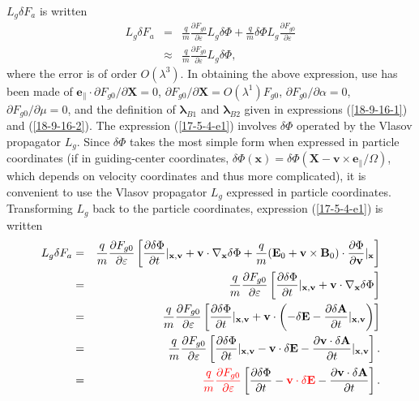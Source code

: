 \documentclass{article}
\newcommand{\nobracket}{}
\newcommand{\tmcolor}[2]{{\color{#1}{#2}}}
\newcommand{\tmmathbf}[1]{\ensuremath{\boldsymbol{#1}}}
\begin{document}
$L_g \delta F_a$ is written
\begin{eqnarray}
  L_g \delta F_a & = & \frac{q}{m}  \frac{\partial F_{g 0}}{\partial
  \varepsilon} L_g \delta \Phi + \frac{q}{m} \delta \Phi L_g \frac{\partial
  F_{g 0}}{\partial \varepsilon} \nonumber\\
  & \approx & \frac{q}{m}  \frac{\partial F_{g 0}}{\partial \varepsilon} L_g
  \delta \Phi,  \label{17-5-4-e1}
\end{eqnarray}
where the error is of order $O (\lambda^3)$. In obtaining the above
expression, use has been made of $\mathbf{e}_{\parallel} \cdot \partial F_{g
0} / \partial \mathbf{X}= 0$, $\partial F_{g 0} / \partial \mathbf{X}= O
(\lambda^1) F_{g 0}$, $\partial F_{g 0} / \partial \alpha = 0$, $\partial F_{g
0} / \partial \mu = 0$, and the definition of $\tmmathbf{\lambda}_{B 1}$ and
$\tmmathbf{\lambda}_{B 2}$ given in expressions (\ref{18-9-16-1}) and
(\ref{18-9-16-2}). The expression (\ref{17-5-4-e1}) involves $\delta \Phi$
operated by the Vlasov propagator $L_g$. Since $\delta \Phi$ takes the most
simple form when expressed in particle coordinates (if in guiding-center
coordinates, $\delta \Phi (\mathbf{x}) = \delta \Phi (\mathbf{X}-\mathbf{v}
\times \mathbf{e}_{\parallel} / \Omega)$, which depends on velocity
coordinates and thus more complicated), it is convenient to use the Vlasov
propagator $L_g$ expressed in particle coordinates. Transforming $L_g$ back to
the particle coordinates, expression (\ref{17-5-4-e1}) is written
\begin{eqnarray}
  L_g \delta F_a & = & \frac{q}{m}  \frac{\partial F_{g 0}}{\partial
  \varepsilon} \left[ \frac{\partial \delta \Phi}{\partial t} |_{\mathbf{x},
  \mathbf{v}} \nobracket +\mathbf{v} \cdot \nabla_{\mathbf{x}} \delta \Phi +
  \frac{q}{m} (\mathbf{E}_0 +\mathbf{v} \times \mathbf{B}_0) \cdot
  \frac{\partial \Phi}{\partial \mathbf{v}} |_{\mathbf{x}} \right] \nonumber\\
  & = & \frac{q}{m}  \frac{\partial F_{g 0}}{\partial \varepsilon} \left[
  \frac{\partial \delta \Phi}{\partial t} |_{\mathbf{x}, \mathbf{v}}
  \nobracket +\mathbf{v} \cdot \nabla_{\mathbf{x}} \delta \Phi \right] \\
  & = & \frac{q}{m}  \frac{\partial F_{g 0}}{\partial \varepsilon} \left[
  \frac{\partial \delta \Phi}{\partial t} |_{\mathbf{x}, \mathbf{v}}
  \nobracket +\mathbf{v} \cdot \left( - \delta \mathbf{E}- \frac{\partial
  \delta \mathbf{A}}{\partial t} |_{\mathbf{x}, \mathbf{v}} \nobracket \right)
  \right] \nonumber\\
  & = & \frac{q}{m}  \frac{\partial F_{g 0}}{\partial \varepsilon} \left[
  \frac{\partial \delta \Phi}{\partial t} |_{\mathbf{x}, \mathbf{v}}
  \nobracket -\mathbf{v} \cdot \delta \mathbf{E}- \frac{\partial \mathbf{v}
  \cdot \delta \mathbf{A}}{\partial t} |_{\mathbf{x}, \mathbf{v}} \nobracket
  \right] . \\
  & = & \tmcolor{red}{\frac{q}{m}  \frac{\partial F_{g 0}}{\partial
  \varepsilon}} \left[ \frac{\partial \delta \Phi}{\partial t} -
  \tmcolor{red}{\mathbf{v} \cdot \delta \mathbf{E}} - \frac{\partial
  \mathbf{v} \cdot \delta \mathbf{A}}{\partial t} \right] . 
\end{eqnarray}
\end{document}
